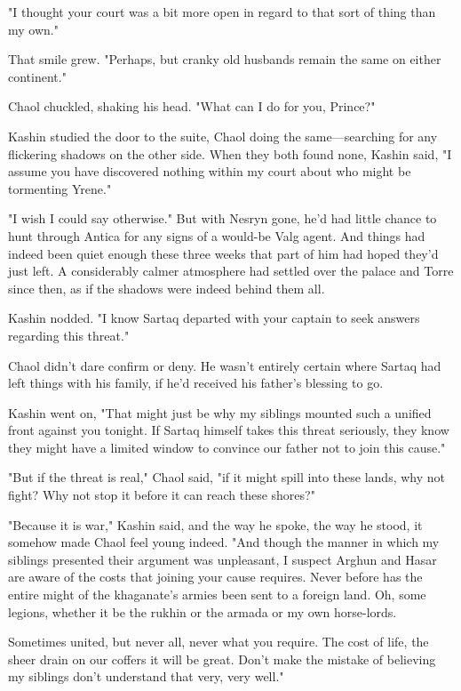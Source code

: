 "I thought your court was a bit more open in regard to that sort of thing than my own."

That smile grew. "Perhaps, but cranky old husbands remain the same on either continent."

Chaol chuckled, shaking his head. "What can I do for you, Prince?"

Kashin studied the door to the suite, Chaol doing the same---searching for any flickering shadows on the other side. When they both found none, Kashin said, "I assume you have discovered nothing within my court about who might be tormenting Yrene."

"I wish I could say otherwise." But with Nesryn gone, he'd had little chance to hunt through Antica for any signs of a would-be Valg agent. And things had indeed been quiet enough these three weeks that part of him had hoped they'd just  left. A considerably calmer atmosphere had settled over the palace and Torre since then, as if the shadows were indeed behind them all.

Kashin nodded. "I know Sartaq departed with your captain to seek answers regarding this threat."

Chaol didn't dare confirm or deny. He wasn't entirely certain where Sartaq had left things with his family, if he'd received his father's blessing to go.

Kashin went on, "That might just be why my siblings mounted such a unified front against you tonight. If Sartaq himself takes this threat seriously, they know they might have a limited window to convince our father not to join this cause."

"But if the threat is real," Chaol said, "if it might spill into these lands, why not fight? Why not stop it before it can reach these shores?"

"Because it is war," Kashin said, and the way he spoke, the way he stood, it somehow made Chaol feel young indeed. "And though the manner in which my siblings presented their argument was unpleasant, I suspect Arghun and Hasar are aware of the costs that joining your cause requires. Never before has the entire might of the khaganate's armies been sent to a foreign land. Oh, some legions, whether it be the rukhin or the armada or my own horse-lords.

Sometimes united, but never all, never what you require. The cost of life, the sheer drain on our coffers  it will be great. Don't make the mistake of believing my siblings don't understand that very, very well."

